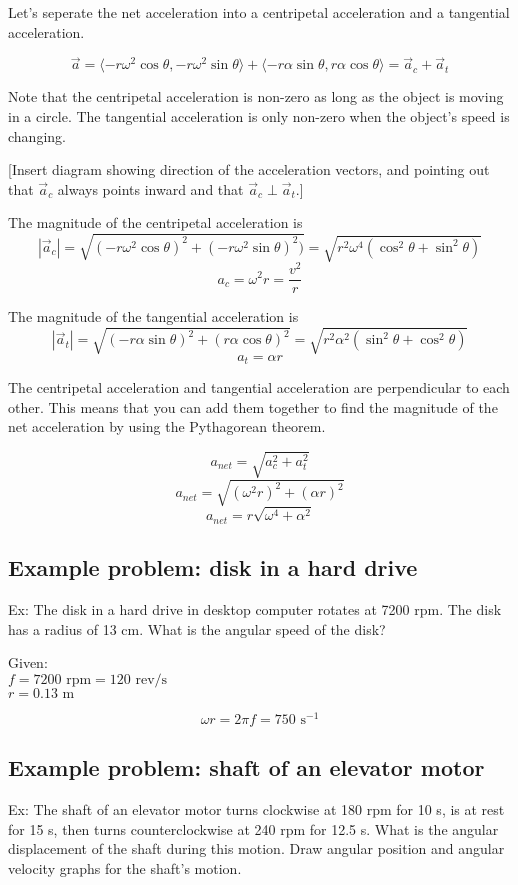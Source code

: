 Let's seperate the net acceleration into a centripetal acceleration and a tangential acceleration.

$$\vec a=\langle{-r\omega^2\cos\theta,-r\omega^2\sin\theta}\rangle+\langle{-r\alpha\sin\theta,r\alpha\cos\theta}\rangle=\vec{a}_c+\vec{a}_t$$

Note that the centripetal acceleration is non-zero as long as the object is moving in a circle. The tangential acceleration is only non-zero when the object's speed is changing.

[Insert diagram showing direction of the acceleration vectors, and pointing out that $\vec{a}_c$ always points inward and that $\vec{a}_c\perp\vec{a}_t$.]
\vspace{8cm}

The magnitude of the centripetal acceleration is
$$|\vec{a}_c|=\sqrt{(-r\omega^2\cos\theta)^2+(-r\omega^2\sin\theta)^2)}=\sqrt{r^2\omega^4(\cos^2\theta+\sin^2\theta)}$$
$$\boxed{a_c=\omega^2r=\frac{v^2}{r}}$$

The magnitude of the tangential acceleration is
$$|\vec{a}_t|=\sqrt{(-r\alpha\sin\theta)^2+(r\alpha\cos\theta)^2}=\sqrt{r^2\alpha^2(\sin^2\theta+\cos^2\theta)}$$
$$\boxed{a_t=\alpha r}$$

The centripetal acceleration and tangential acceleration are perpendicular to each other. This means that you can add them together to find the magnitude of the net acceleration by using the Pythagorean theorem.

$$a_{net}=\sqrt{a_c^2+a_t^2}$$
$$a_{net}=\sqrt{(\omega^2 r)^2+(\alpha r)^2}$$
$$\boxed{a_{net}=r\sqrt{\omega^4+\alpha^2}}$$

\subsection*{Example problem: disk in a hard drive}
Ex: The disk in a hard drive in desktop computer rotates at 7200 rpm. The disk has a radius of 13 cm. What is the angular speed of the disk?

Given:\\
$f=7200\mbox{ rpm}=120\mbox{ rev/s}$\\
$r=0.13\mbox{ m}$

$$\omega{r}=2\pi f=750\mbox{ s}^{-1}$$

\subsection*{Example problem: shaft of an elevator motor}
Ex: The shaft of an elevator motor turns clockwise at 180 rpm for 10 s, is at rest for 15 s, then turns counterclockwise at 240 rpm for 12.5 s. What is the angular displacement of the shaft during this motion. Draw angular position and angular velocity graphs for the shaft's motion.

